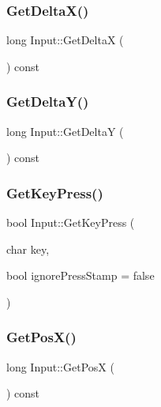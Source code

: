 \subsubsection{\texorpdfstring{Get\+Delta\+X()}{GetDeltaX()}}
{\footnotesize\ttfamily long Input\+::\+Get\+DeltaX (\begin{DoxyParamCaption}{ }\end{DoxyParamCaption}) const}

\hypertarget{class_input_a6aa19d7395fe668fdce3a5295ae3e786}{}\label{class_input_a6aa19d7395fe668fdce3a5295ae3e786} 
\subsubsection{\texorpdfstring{Get\+Delta\+Y()}{GetDeltaY()}}
{\footnotesize\ttfamily long Input\+::\+Get\+DeltaY (\begin{DoxyParamCaption}{ }\end{DoxyParamCaption}) const}

\hypertarget{class_input_af1b5b0b8d188e4fb42b57cf9453073d8}{}\label{class_input_af1b5b0b8d188e4fb42b57cf9453073d8} 
\subsubsection{\texorpdfstring{Get\+Key\+Press()}{GetKeyPress()}}
{\footnotesize\ttfamily bool Input\+::\+Get\+Key\+Press (\begin{DoxyParamCaption}\item[{char}]{key,  }\item[{bool}]{ignore\+Press\+Stamp = {\ttfamily false} }\end{DoxyParamCaption})}

\hypertarget{class_input_a06cd932d855b618964ddced8178ab831}{}\label{class_input_a06cd932d855b618964ddced8178ab831} 
\subsubsection{\texorpdfstring{Get\+Pos\+X()}{GetPosX()}}
{\footnotesize\ttfamily long Input\+::\+Get\+PosX (\begin{DoxyParamCaption}{ }\end{DoxyParamCaption}) const}

